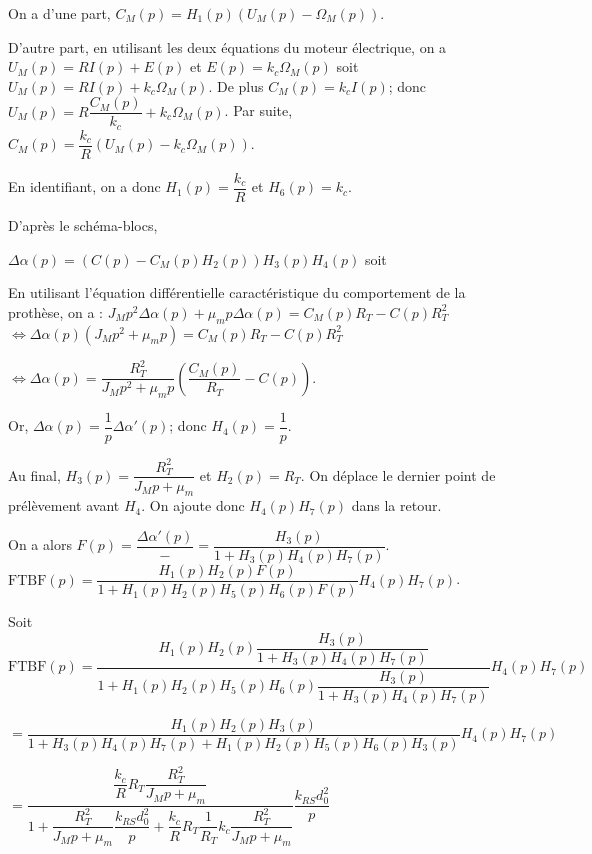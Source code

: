 \begin{corrigebox}
On a d'une part, $C_M(p)=H_1(p)\left(U_M(p)-\Omega_M(p)\right)$. 

D'autre part, en utilisant les deux équations du moteur électrique, on a $U_M (p)=RI (p)+E(p)$ et $E (p )=k_c \Omega_M (p)$ soit  $U_M (p)=RI (p)+k_c \Omega_M (p)$. De plus $C_M (p)=k_c I (p )$; donc $U_M (p)=R\dfrac{C_M(p)}{k_c}+k_c \Omega_M (p)$. 
Par suite, $C_M(p)=\dfrac{k_c}{R}\left(U_M (p)-k_c \Omega_M (p)\right)$.

En identifiant, on a donc $H_1(p)=\dfrac{k_c}{R}$ et  $H_6(p)={k_c}$.

D'après le schéma-blocs, 

$\Delta \alpha(p) = \left(C(p)-C_M(p)H_2(p)\right)H_3(p)H_4(p)$ soit 

En utilisant l'équation différentielle caractéristique du comportement de la prothèse, on a : 
$J_M p^2 \Delta \alpha(p) + \mu_m p \Delta \alpha(p)  = C_M(p)R_T -C(p)R_T^2$
$\Leftrightarrow \Delta \alpha(p) \left(J_M p^2  + \mu_m p \right)  = C_M(p)R_T -C(p)R_T^2$

$\Leftrightarrow \Delta \alpha(p)  = \dfrac{R_T^2}{J_M p^2  + \mu_m p}\left(\dfrac{C_M(p)}{R_T} -C(p)\right)$.

Or, $\Delta \alpha(p) = \dfrac{1}{p}\Delta \alpha'(p)$; donc $H_4(p)=\dfrac{1}{p}$.

Au final, $H_3(p) = \dfrac{R_T^2}{J_M p  + \mu_m }$ et $H_2(p)=R_T$.
On déplace le dernier point de prélèvement avant $H_4$. On ajoute donc $H_4(p)H_7(p)$ dans la retour. 

On a alors $F(p)=\dfrac{\Delta \alpha'(p)}{-} = \dfrac{H_3(p)}{1+H_3(p)H_4(p)H_7(p)}$.
$\text{FTBF}(p)  = \dfrac{H_1(p)H_2(p) F(p)}{1+H_1(p)H_2(p)H_5(p)H_6(p) F(p)}H_4(p)H_7(p) $.

Soit 
$\text{FTBF}(p)  = \dfrac{H_1(p)H_2(p) \dfrac{H_3(p)}{1+H_3(p)H_4(p)H_7(p)}}{1+H_1(p)H_2(p)H_5(p)H_6(p) \dfrac{H_3(p)}{1+H_3(p)H_4(p)H_7(p)}}H_4(p)H_7(p) $

$= \dfrac{H_1(p)H_2(p) H_3(p)}{1+H_3(p)H_4(p)H_7(p)+H_1(p)H_2(p)H_5(p)H_6(p) H_3(p)}H_4(p)H_7(p) $

$= \dfrac{\dfrac{k_c}{R}R_T \dfrac{R_T^2}{J_M p  + \mu_m }}{1+\dfrac{R_T^2}{J_M p  + \mu_m }\dfrac{k_{RS}d_0^2}{p}+\dfrac{k_c}{R}R_T \dfrac{1}{R_T}k_c \dfrac{R_T^2}{J_M p  + \mu_m }}\dfrac{k_{RS}d_0^2}{p} $


\end{corrigebox}

